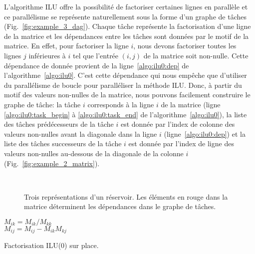 L'algorithme ILU offre la possibilité de factoriser certaines lignes en parallèle et ce parallélisme se représente naturellement sous la forme d'un graphe de tâches (Fig.~\ref{fig:example_3_dag}).
%
Chaque tâche représente la factorisation d'une ligne de la matrice et les dépendances entre les tâches sont données par le motif de la matrice.
%
En effet, pour factoriser la ligne $i$, nous devons factoriser toutes les lignes $j$ inférieures à $i$ tel que l'entrée $(i,j)$ de la matrice soit non-nulle.
%
Cette dépendance de donnée provient de la ligne~\ref{algo:ilu0:dep} de l'algorithme~\ref{algo:ilu0}.
%
C'est cette dépendance qui nous empêche que d'utiliser du parallélisme de boucle pour paralléliser la méthode ILU.
%
Donc, à partir du motif des valeurs non-nulles de la matrice, nous pouvons facilement construire le graphe de tâche:
%
la tâche $i$ corresponds à la ligne $i$ de la matrice (ligne \ref{algo:ilu0:task_begin} à \ref{algo:ilu0:task_end} de l'algorithme~\ref{algo:ilu0}), la liste des tâches prédécesseurs de la tâche $i$ est donnée par l'index de colonne des valeurs non-nulles avant la diagonale dans la ligne $i$ (ligne~\ref{algo:ilu0:dep}) et la liste des tâches successeurs de la tâche $i$ est donnée par l'index de ligne des valeurs non-nulles au-dessous de la diagonale de la colonne $i$ (Fig.~\ref{fig:example_2_matrix}).
\begin{figure}[!h]
     \begin{center}
        ~
        ~
    \end{center}
    \caption{Trois représentations d'un réservoir. Les éléments en rouge dans la matrice déterminent les dépendances dans le graphe de tâches.}
    \label{fig:exemple_3_dag}
\end{figure}
\begin{algorithm}
   {
     { \label{algo:ilu0:task_begin}
      $M_{ik} = M_{ik} / M_{kk}$ \label{algo:ilu0:dep}\\
       {
        $M_{ij} = M_{ij} - M_{ik}M_{kj}$ \\
      }
    } \label{algo:ilu0:task_end}
  }
  \caption{Factorisation ILU(0) sur place.}
  \label{algo:ilu0}
\end{algorithm}

